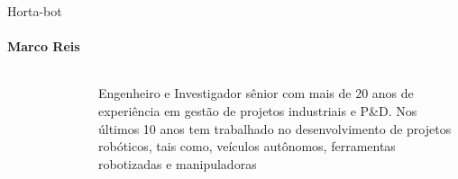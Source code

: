 \begin{frame}[t]{Horta-bot}
    \transboxout[duration=0.5]
    \framesubtitle{Marco Reis}
    \begin{columns}
            
            \begin{figure}
                \vspace*{-0.75cm}
                \hspace*{-1.5cm}
            \end{figure}
            
                \vspace*{0.1cm}
                \justifying
                
                Engenheiro e Investigador sênior com mais de 20 anos de experiência em gestão de projetos industriais e P\&D. Nos últimos 10 anos tem trabalhado no desenvolvimento de projetos robóticos, tais como, veículos autônomos, ferramentas robotizadas e manipuladoras
    \end{columns}
\end{frame}

